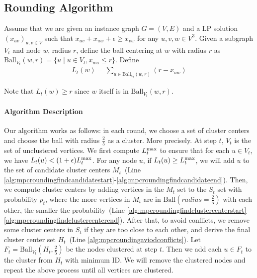 \documentclass[11pt]{article}
\newcommand{\ball}{\mathrm{Ball}}
\newcommand{\twofive}{\frac{2}{5}}
\begin{document}
\begin{CJK*}{UTF8}{gbsn}
\subsection{Rounding Algorithm}
Assume that we are given an instance graph $G = (V, E)$ and a LP solution $( x_{uv} )_{u,v \in V}$ such that $x_{uv} + x_{uw} + \epsilon \geq x_{vw}$ for any $u, v, w \in V^3$.  Given a subgraph $V_t$ and node $w$, radius $r$, define the ball centering at $w$ with radius $r$ as $\ball_{V_t}(w, r) = \{ u \mid u \in V_t, x_{wu} \leq r \} $. Define  
\begin{align*}
    L_t(w) = \sum_{u \in \ball_{V_t}(w, r) }( r - x_{uw} )
\end{align*}

Note that $L_t(w) \geq r$ since $w$ itself is in $ \ball_{V_t}(w, r)$.

\paragraph{Algorithm Description}Our algorithm works as follows: in each round, we choose a set of cluster centers and choose the ball with radius $\twofive$ as a cluster. More precisely. At step $t$, $V_t$ is the set of unclustered vertices. We first compute $L_t^{\textmd{max}}$ to ensure that for each $u\in V_t$, we have $L_t(u) < (1+\epsilon) L_t^{\textmd{max}}$. For any node $u$, if $L_t(u) \geq L_t^{\textmd{max}}$, we will add $u$ to the set of candidate cluster centers $M_t$~(Line \ref{alg:mpcroundingfindcandidatestart}-\ref{alg:mpcroundingfindcandidateend}). Then, we compute cluster centers by adding vertices in the $M_t$ set to the $S_t$ set with probability $p_t$, where the more vertices in $M_t$ are in $\ball(radius=\twofive)$ with each other, the smaller the probability~(Line \ref{alg:mpcroundingfindclustercenterstart}-\ref{alg:mpcroundingfindclustercenterend}). After that, to avoid conflicts, we remove some cluster centers in $S_t$ if they are too close to each other, and derive the final cluster center set $H_t$~(Line \ref{alg:mpcroundingaviodconflicts}). Let $F_t = \ball_{V_t}(H_t,\twofive)$ be the nodes clustered at step $t$. Then we add each $u \in F_t$ to the cluster from $H_t$ with minimum ID. We will remove the clustered nodes and repeat the above process until all vertices are clustered.



\end{CJK*}
\end{document}
